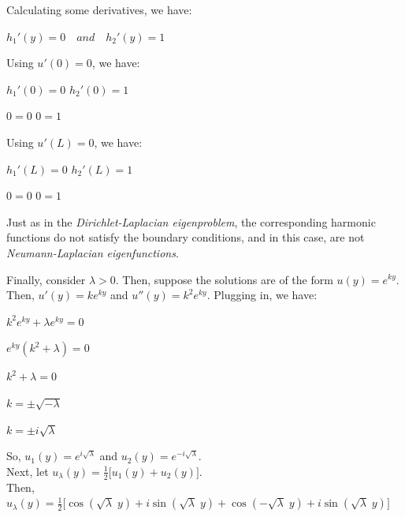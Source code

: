 \documentclass[12pt, executivepaper]{article}
\begin{document}
\begin{flushleft}
Calculating some derivatives, we have:

\begin{center}

$h_{1}'(y)=0 \quad and \quad h_{2}'(y)=1$

\end{center}

Using $u'(0)=0$, we have: 

\begin{center}

$h_{1}'(0)=0$ \quad \quad \quad $h_{2}'(0)=1$

$0=0$ \quad \quad \quad $0=1$

\end{center}

Using $u'(L)=0$, we have:

\begin{center}

$h_{1}'(L)=0$ \quad \quad \quad $h_{2}'(L)=1$

$0=0$ \quad \quad \quad $0=1$

\end{center}

Just as in the \textit{Dirichlet-Laplacian eigenproblem}, the corresponding harmonic functions do not satisfy the boundary conditions, and in this case, are not \textit{Neumann-Laplacian eigenfunctions}.

Finally, consider $\lambda > 0$. Then, suppose the solutions are of the form $u(y)=e^{ky}$. Then, $u'(y)=ke^{ky}$ and $u''(y)=k^2e^{ky}$. Plugging in, we have: 

\begin{center}

$k^2e^{ky}+ \lambda e^{ky}=0$

$e^{ky}(k^2+ \lambda)=0$

$k^2+ \lambda=0$

$k=\pm \sqrt{-\lambda}$

$k=\pm i \sqrt{\lambda}$

\end{center}

So, $u_{1}(y)=e^{i \sqrt{\lambda}}$ and $u_{2}(y)=e^{-i \sqrt{\lambda}}$. \\

Next, let $u_{\lambda}(y)=\frac{1}{2}\bigg[u_{1}(y)+u_{2}(y)\bigg]$. \\

Then, \\ 
$u_{\lambda}(y)=\frac{1}{2}\bigg[\cos(\sqrt{\lambda} \; y)+i\sin(\sqrt{\lambda} \; y)+\cos(-\sqrt{\lambda} \; y)+i\sin(\sqrt{\lambda} \; y)\bigg]$ \\


\end{flushleft}
\end{document}

